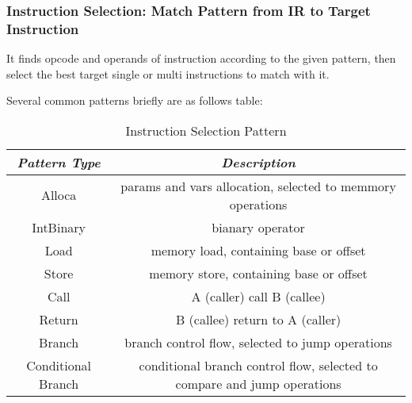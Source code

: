 \subsubsection{Instruction Selection: Match Pattern from IR to Target Instruction}

It finds opcode and operands of instruction according to the given pattern, then select the best target single or multi instructions to match with it.

Several common patterns briefly are as follows table:
\begin{table}[!ht]
    \centering
    \begin{tabular}{|c|c|}
        \hline
        \textit{Pattern Type} & \textit{Description} \\ \hline
        Alloca  & params and vars allocation, selected to memmory operations \\ \hline
        IntBinary & bianary operator \\ \hline
        Load & memory load, containing base or offset \\ \hline
        Store & memory store, containing base or offset  \\ \hline
        Call & A (caller) call B (callee) \\ \hline
        Return & B (callee) return to A (caller) \\ \hline
        Branch & branch control flow, selected to jump operations \\ \hline
        Conditional Branch & conditional branch control flow, selected to compare and jump operations \\ \hline
    \end{tabular}
    \caption{Instruction Selection Pattern}
    \label{table:Instruction-pattern}
\end{table}

